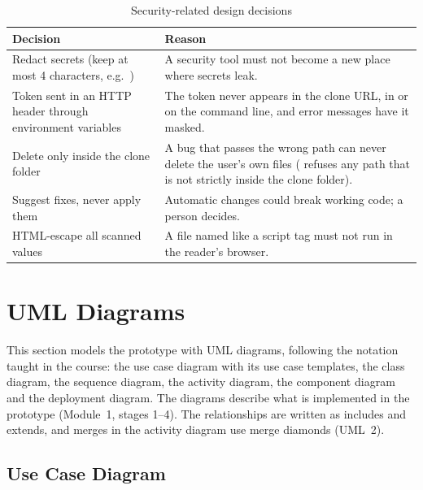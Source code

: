 \documentclass[12pt,a4paper]{article}
\newcommand{\code}[1]{\texttt{\detokenize{#1}}}
\begin{document}
\begin{table}[H]
\centering
\caption{Security-related design decisions}
\label{tab:security}
\begin{tabularx}{\textwidth}{@{}p{4.3cm}X@{}}
\toprule
\textbf{Decision} & \textbf{Reason} \\
\midrule
Redact secrets (keep at most 4 characters, e.g.\ \code{ghp_***}) & A security tool must not become a new place where secrets leak. \\
Token sent in an HTTP header through environment variables & The token never appears in the clone URL, in \code{.git/config} or on the command line, and error messages have it masked. \\
Delete only inside the clone folder & A bug that passes the wrong path can never delete the user's own files (\code{remove_tree} refuses any path that is not strictly inside the clone folder). \\
Suggest fixes, never apply them & Automatic changes could break working code; a person decides. \\
HTML-escape all scanned values & A file named like a script tag must not run in the reader's browser. \\
\bottomrule
\end{tabularx}
\end{table}
\section{UML Diagrams}

This section models the prototype with UML diagrams, following the notation taught in the course: the use case diagram with its use case templates, the class diagram, the sequence diagram, the activity diagram, the component diagram and the deployment diagram. The diagrams describe what is implemented in the prototype (Module~1, stages 1--4). The relationships are written as \guillemotleft includes\guillemotright{} and \guillemotleft extends\guillemotright{}, and merges in the activity diagram use merge diamonds (UML~2).

\subsection{Use Case Diagram}
\end{document}
